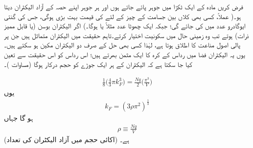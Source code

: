 فرض کریں مادہ کے ایک ٹکڑا میں  جوہر پائے جاتے ہوں اور ہر جوہر اپنے حصہ کے  آزاد الیکٹران دیتا ہو۔( عملاً،  کسی بھی کلاں بین جسامت کے چیز کے لئے  کی قیمت بہت بڑی ہوگی،   جس کی گنتی  ایوگادرو  عدد میں کی  جائے گی؛  جبکہ  ایک چھوٹا عدد مثلاً    یا   ہوگا۔)  اگر الیکٹران بوسن (یا قابل ممیز ذرات) ہوتے تب وہ زمینی حال  میں سکونیت  اختیار کرتے۔تاہم  حقیقت میں  الیکٹران  متماثل  ہیں جن پر پالی اصول مناعت کا اطلاق ہوتا ہے، لہٰذا کسی بھی حل کے  صرف دو الیکٹران مکین  ہو سکتے ہیں۔ یوں یہ  الیکٹران   فضا میں رداس    کے کرہ کا ایک مثمن    بھرتے ہیں؛ اس رداس کو اس حقیقت سے تعین کیا جا سکتا ہے کہ الیکٹران کے   ہر ایک جوڑے  کو  حجم درکار ہوگا  (مساوات )۔

	\begin{align*}
		\frac{1}{8}\big(\frac{4}{3} \pi k^{3}_F\big ) =  \frac{Nq}{2}\big (\frac{\pi^3}{V}\big )
	\end{align*}
یوں
\begin{align}\label{مساوات_متماثل_مستطیل_الف}
	k_F =(3\rho\pi^{2})^{\frac{1}{3}}
\end{align}
ہو گا جہاں
\begin{align}\label{مساوات_متماثل_مستطیل_ب}
	\rho \equiv \frac{Nq}{V}
\end{align}
  (اکائی  حجم میں آزاد الیکٹران کی تعداد) ہے۔


